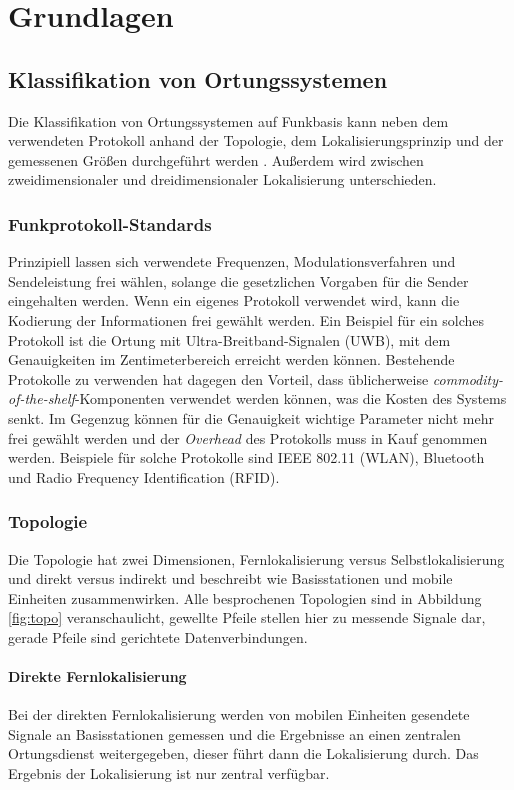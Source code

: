 \chapter{Grundlagen}
\label{ch:Grundlagen}

\section{Klassifikation von Ortungssystemen}
\label{ch:Einleitung:sec:Ortungssysteme}
Die Klassifikation von Ortungssystemen auf Funkbasis kann neben dem verwendeten Protokoll anhand der Topologie, dem Lokalisierungsprinzip und der gemessenen Größen durchgeführt werden \cite{liu2007survey}.
Außerdem wird zwischen zweidimensionaler und dreidimensionaler Lokalisierung unterschieden.

\subsection{Funkprotokoll-Standards}
Prinzipiell lassen sich verwendete Frequenzen, Modulationsverfahren und Sendeleistung frei wählen, solange die gesetzlichen Vorgaben für die Sender eingehalten werden. Wenn ein eigenes Protokoll verwendet wird, kann die Kodierung der Informationen frei gewählt werden. 
Ein Beispiel für ein solches Protokoll ist die Ortung mit Ultra-Breitband-Signalen (UWB), mit dem Genauigkeiten im Zentimeterbereich erreicht werden können. Bestehende Protokolle zu verwenden hat dagegen den Vorteil, dass üblicherweise \emph{commodity-of-the-shelf}-Komponenten verwendet werden können, was die Kosten des Systems senkt. Im Gegenzug können für die Genauigkeit wichtige Parameter nicht mehr frei gewählt werden und der \emph{Overhead} des Protokolls muss in Kauf genommen werden. Beispiele für solche Protokolle sind IEEE 802.11 (WLAN), Bluetooth und Radio Frequency Identification (RFID).

\subsection{Topologie}
Die Topologie hat zwei Dimensionen, Fernlokalisierung versus Selbstlokalisierung und direkt versus indirekt und beschreibt wie Basisstationen und mobile Einheiten zusammenwirken. 
Alle besprochenen Topologien sind in Abbildung \ref{fig:topo} veranschaulicht, gewellte Pfeile stellen hier zu messende Signale dar, gerade Pfeile sind gerichtete Datenverbindungen.

\subsubsection{Direkte Fernlokalisierung} 
Bei der direkten Fernlokalisierung werden von mobilen Einheiten gesendete Signale an Basisstationen gemessen und die Ergebnisse an einen zentralen Ortungsdienst weitergegeben, dieser führt dann die Lokalisierung durch. Das Ergebnis der Lokalisierung ist nur zentral verfügbar. 

